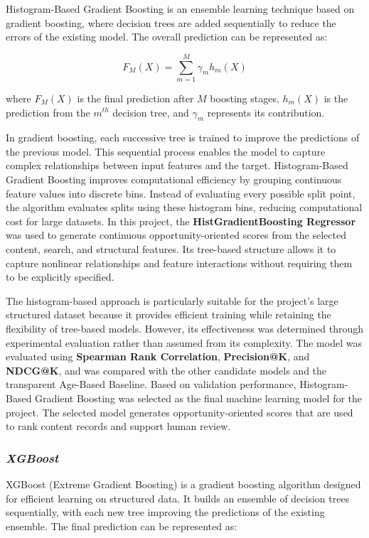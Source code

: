 \documentclass[12pt,a4paper]{report}
\begin{document}
Histogram-Based Gradient Boosting is an ensemble learning technique based on gradient boosting, where decision trees are added sequentially to reduce the errors of the existing model. The overall prediction can be represented as:

\begin{equation}
F_M(X) = \sum_{m=1}^{M} \gamma_m h_m(X)
\end{equation}

where $F_M(X)$ is the final prediction after $M$ boosting stages, $h_m(X)$ is the prediction from the $m^{th}$ decision tree, and $\gamma_m$ represents its contribution.

In gradient boosting, each successive tree is trained to improve the predictions of the previous model. This sequential process enables the model to capture complex relationships between input features and the target. Histogram-Based Gradient Boosting improves computational efficiency by grouping continuous feature values into discrete bins. Instead of evaluating every possible split point, the algorithm evaluates splits using these histogram bins, reducing computational cost for large datasets. In this project, the \textbf{HistGradientBoosting Regressor} was used to generate continuous opportunity-oriented scores from the selected content, search, and structural features. Its tree-based structure allows it to capture nonlinear relationships and feature interactions without requiring them to be explicitly specified.

The histogram-based approach is particularly suitable for the project's large structured dataset because it provides efficient training while retaining the flexibility of tree-based models. However, its effectiveness was determined through experimental evaluation rather than assumed from its complexity. The model was evaluated using \textbf{Spearman Rank Correlation}, \textbf{Precision@K}, and \textbf{NDCG@K}, and was compared with the other candidate models and the transparent Age-Based Baseline. Based on validation performance, Histogram-Based Gradient Boosting was selected as the final machine learning model for the project. The selected model generates opportunity-oriented scores that are used to rank content records and support human review.

\subsubsection{\textit{XGBoost}}

XGBoost (Extreme Gradient Boosting) is a gradient boosting algorithm designed for efficient learning on structured data. It builds an ensemble of decision trees sequentially, with each new tree improving the predictions of the existing ensemble. The final prediction can be represented as:
\end{document}
